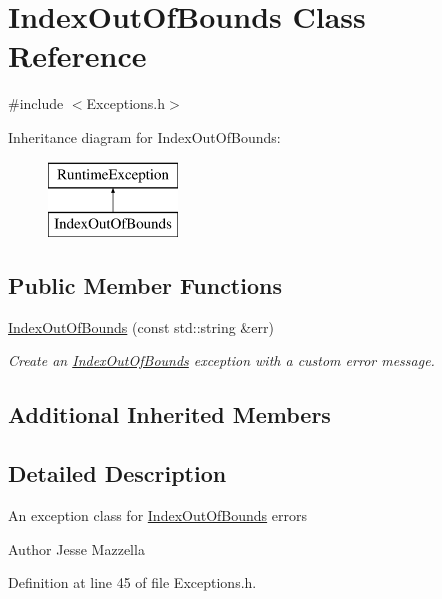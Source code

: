 \hypertarget{class_index_out_of_bounds}{}\section{Index\+Out\+Of\+Bounds Class Reference}
\label{class_index_out_of_bounds}


{\ttfamily \#include $<$Exceptions.\+h$>$}

Inheritance diagram for Index\+Out\+Of\+Bounds\+:\begin{figure}[H]
\begin{center}
\leavevmode
\includegraphics[height=2.000000cm]{class_index_out_of_bounds}
\end{center}
\end{figure}
\subsection*{Public Member Functions}
\begin{DoxyCompactItemize}
\item 
\hyperlink{class_index_out_of_bounds_ac7f448aef9aeaeadef56ed81a30ad8ff}{Index\+Out\+Of\+Bounds} (const std\+::string \&err)
\begin{DoxyCompactList}\small\item\em Create an \hyperlink{class_index_out_of_bounds}{Index\+Out\+Of\+Bounds} exception with a custom error message. \end{DoxyCompactList}\end{DoxyCompactItemize}
\subsection*{Additional Inherited Members}


\subsection{Detailed Description}
An exception class for \hyperlink{class_index_out_of_bounds}{Index\+Out\+Of\+Bounds} errors \begin{DoxyAuthor}{Author}
Jesse Mazzella 
\end{DoxyAuthor}


Definition at line 45 of file Exceptions.\+h.



